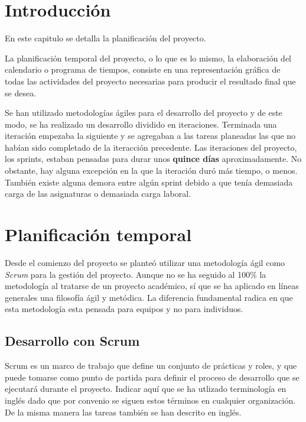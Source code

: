
\section{Introducción}\label{introduccion-plan}
En este capitulo se detalla la planificación del proyecto. 

La planificación temporal del proyecto, o lo que es lo mismo, la elaboración del calendario o programa de tiempos, consiste en una representación gráfica de todas las actividades del proyecto necesarias para producir el resultado final que se desea.

Se han utilizado metodologías ágiles para el desarrollo del proyecto y de este modo, se ha realizado un desarrollo dividido en iteraciones. Terminada una iteración empezaba la siguiente y se agregaban a las tareas planeadas las que no habían sido completado de la iteracción precedente. Las iteraciones del proyecto, los sprints, estaban pensadas para durar unos \textbf{quince días} aproximadamente. No obstante, hay alguna excepción en la que la iteración duró más tiempo, o menos. También existe alguna demora entre algún sprint debido a que tenía demasiada carga de las asignaturas o demasiada carga laboral.

\section{Planificación temporal}\label{planificacion-temporal}
Desde el comienzo del proyecto se planteó utilizar una metodología ágil como
\emph{Scrum} para la gestión del proyecto. Aunque no se ha seguido al 100\% la
metodología al tratarse de un proyecto académico, sí que se ha aplicado
en líneas generales una filosofía ágil y metódica. La diferencia fundamental radica en que esta metodología esta pensada para equipos y no para individuos.

\subsection{Desarrollo con Scrum}

Scrum es un marco de trabajo que define un conjunto de prácticas y roles, y que puede tomarse como punto de partida para definir el proceso de desarrollo que se ejecutará durante el proyecto. Indicar aquí que se ha utlizado terminología en inglés dado que por convenio se siguen estos términos en cualquier organización. De la misma manera las tareas también se han descrito en inglés. 

